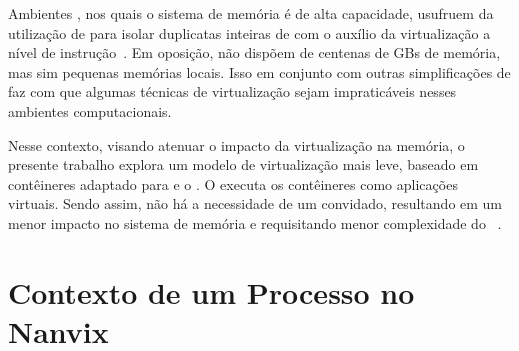 Ambientes \cloud, nos quais o sistema de memória é de alta capacidade, usufruem da utilização de \vms para isolar duplicatas inteiras de \oss com o auxílio da virtualização a nível de instrução~\cite{sharma2016containers}. Em oposição, \lws não dispõem de centenas de GBs de memória, mas sim pequenas memórias locais. Isso em conjunto com outras simplificações de \hardware faz com que algumas técnicas de virtualização sejam impraticáveis nesses ambientes computacionais.

Nesse contexto, visando atenuar o impacto da virtualização na memória, o presente trabalho explora um modelo de virtualização mais leve, baseado em contêineres adaptado para \lws e o \nanvix. O \so executa os contêineres como aplicações virtuais. Sendo assim, não há a necessidade de um \os convidado, resultando em um menor impacto no sistema de memória e requisitando menor complexidade do \hardware~\cite{thalheim2018cntr, sharma2016containers,zhang2018comparative}.




\section{Contexto de um Processo no Nanvix}

